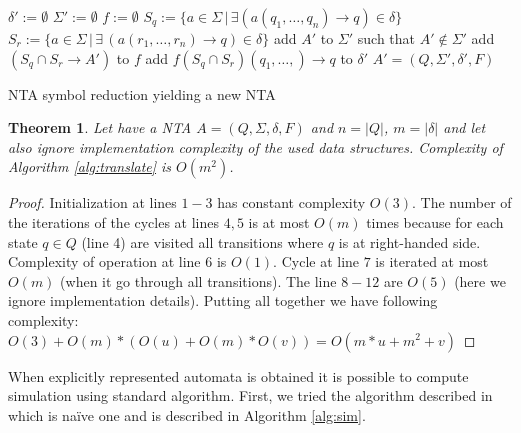 \documentclass[a4paper, 12pt]{article}
\newtheorem{theorem}{Theorem}
\begin{document}
\begin{algorithm}[h]
    $\delta' := \emptyset $\;
    $\Sigma' := \emptyset $\;
	$f := \emptyset$\;
    {
		{
			$S_q := \{ a\in \Sigma \,|\, \exists(a(q_1,\ldots,q_n) \rightarrow q) \in \delta\}$\;
			{
				$S_r := \{a\in \Sigma \,|\, \exists\, (a(r_1,\ldots,r_n) \rightarrow q) \in \delta\}$\;
				{
					add $A'$ to $\Sigma'$ such that $A' \not\in \Sigma'$\;
					add $(S_q \cap S_r \rightarrow A')$ to $f$\;
				}
				add $f(S_q \cap S_r)(q_1,\ldots,) \rightarrow q$ to $\delta'$\;
			}
		}
    }
	\Return $A' = (Q, \Sigma', \delta', F)$
\caption{NTA symbol reduction yielding a new NTA}
\label{alg:translate}
\end{algorithm}


\begin{theorem}
Let have a NTA $A = (Q, \Sigma, \delta, F)$ and $n = |Q|$, $m = |\delta|$ and let also ignore implementation
complexity of the used data structures.
Complexity of Algorithm \ref{alg:translate} is $O(m^2)$.
\end{theorem}
\begin{proof}
Initialization at lines $1-3$ has constant complexity $O(3)$.
The number of the iterations of the cycles at lines $4,5$ is at most $O(m)$ times because for each state $q\in Q$ (line 4) are
visited all transitions where $q$ is at right-handed side.
Complexity of operation at line $6$ is $O(1)$.
Cycle at line $7$ is iterated at most $O(m)$ (when it go through all transitions).
The line $8-12$ are $O(5)$ (here we ignore implementation details).
Putting all together we have following complexity: $O(3) + O(m)*(O(u)+O(m)*O(v)) = O(m*u + m^2+v)$
\end{proof}

When explicitly represented automata is obtained it is possible to compute simulation using standard algorithm.
First, we tried the algorithm described in \cite{lengal:trees} which is na{\"i}ve one and is described in Algorithm \ref{alg:sim}.
\end{document}
